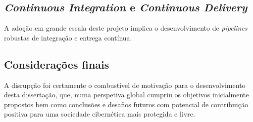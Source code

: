 \subsection{\emph{Continuous Integration} e \emph{Continuous Delivery}}
A adoção em grande escala deste projeto implica o desenvolvimento de \emph{pipelines} robustas de integração e entrega contínua.

\subsection{Considerações finais}
A disrupção foi certamente o combustível de motivação para o desenvolvimento desta dissertação, que, numa perspetiva global cumpriu os objetivos inicialmente propostos bem como conclusões e desafios futuros com potencial de contribuição positiva para uma sociedade cibernética mais protegida e livre.
